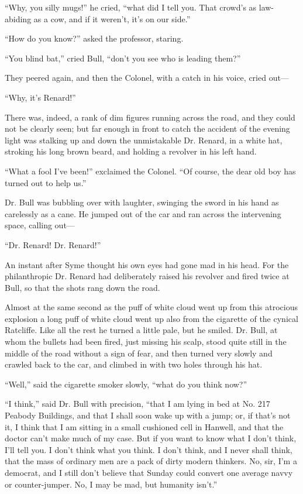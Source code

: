 “Why, you silly mugs!” he cried, “what did I tell you. That crowd’s as law-abiding as a cow, and if it weren’t, it’s on our side.”

“How do you know?” asked the professor, staring.

“You blind bat,” cried Bull, “don’t you see who is leading them?”

They peered again, and then the Colonel, with a catch in his voice, cried out⁠—

“Why, it’s Renard!”

There was, indeed, a rank of dim figures running across the road, and they could not be clearly seen; but far enough in front to catch the accident of the evening light was stalking up and down the unmistakable Dr. Renard, in a white hat, stroking his long brown beard, and holding a revolver in his left hand.

“What a fool I’ve been!” exclaimed the Colonel. “Of course, the dear old boy has turned out to help us.”

Dr. Bull was bubbling over with laughter, swinging the sword in his hand as carelessly as a cane. He jumped out of the car and ran across the intervening space, calling out⁠—

“Dr. Renard! Dr. Renard!”

An instant after Syme thought his own eyes had gone mad in his head. For the philanthropic Dr. Renard had deliberately raised his revolver and fired twice at Bull, so that the shots rang down the road.

Almost at the same second as the puff of white cloud went up from this atrocious explosion a long puff of white cloud went up also from the cigarette of the cynical Ratcliffe. Like all the rest he turned a little pale, but he smiled. Dr. Bull, at whom the bullets had been fired, just missing his scalp, stood quite still in the middle of the road without a sign of fear, and then turned very slowly and crawled back to the car, and climbed in with two holes through his hat.

“Well,” said the cigarette smoker slowly, “what do you think now?”

“I think,” said Dr. Bull with precision, “that I am lying in bed at No. 217 Peabody Buildings, and that I shall soon wake up with a jump; or, if that’s not it, I think that I am sitting in a small cushioned cell in Hanwell, and that the doctor can’t make much of my case. But if you want to know what I don’t think, I’ll tell you. I don’t think what you think. I don’t think, and I never shall think, that the mass of ordinary men are a pack of dirty modern thinkers. No, sir, I’m a democrat, and I still don’t believe that Sunday could convert one average navvy or counter-jumper. No, I may be mad, but humanity isn’t.”

